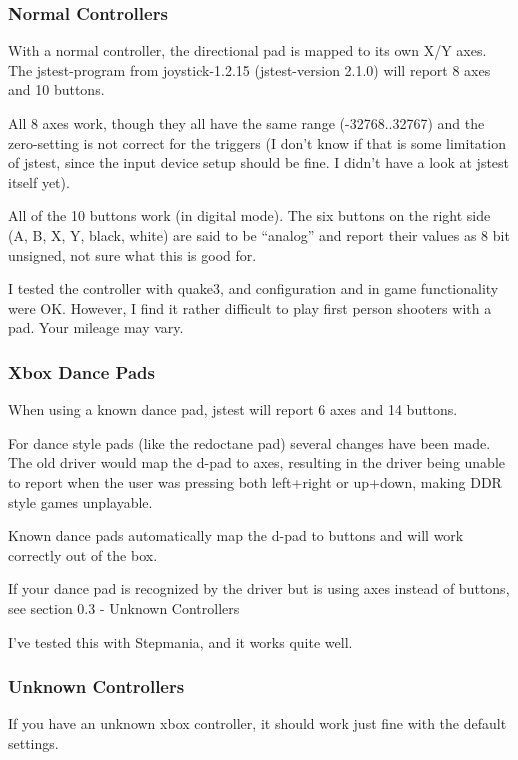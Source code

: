\documentclass[a4paper,8pt,english]{sphinxmanual}
\begin{document}
\subsubsection{Normal Controllers}
\label{input/devices/xpad:normal-controllers}
With a normal controller, the directional pad is mapped to its own X/Y axes.
The jstest-program from joystick-1.2.15 (jstest-version 2.1.0) will report 8
axes and 10 buttons.

All 8 axes work, though they all have the same range (-32768..32767)
and the zero-setting is not correct for the triggers (I don't know if that
is some limitation of jstest, since the input device setup should be fine. I
didn't have a look at jstest itself yet).

All of the 10 buttons work (in digital mode). The six buttons on the
right side (A, B, X, Y, black, white) are said to be ``analog'' and
report their values as 8 bit unsigned, not sure what this is good for.

I tested the controller with quake3, and configuration and
in game functionality were OK. However, I find it rather difficult to
play first person shooters with a pad. Your mileage may vary.


\subsubsection{Xbox Dance Pads}
\label{input/devices/xpad:xbox-dance-pads}
When using a known dance pad, jstest will report 6 axes and 14 buttons.

For dance style pads (like the redoctane pad) several changes
have been made.  The old driver would map the d-pad to axes, resulting
in the driver being unable to report when the user was pressing both
left+right or up+down, making DDR style games unplayable.

Known dance pads automatically map the d-pad to buttons and will work
correctly out of the box.

If your dance pad is recognized by the driver but is using axes instead
of buttons, see section 0.3 - Unknown Controllers

I've tested this with Stepmania, and it works quite well.


\subsubsection{Unknown Controllers}
\label{input/devices/xpad:unknown-controllers}
If you have an unknown xbox controller, it should work just fine with
the default settings.
\end{document}
